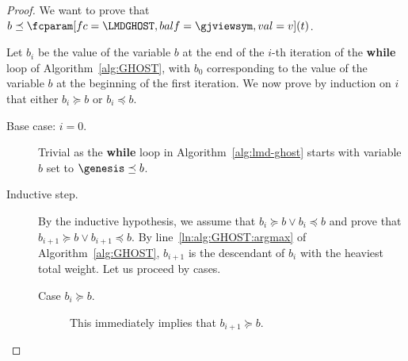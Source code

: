 \documentclass{article}
\begin{document}
\begin{proof}


    We want to prove that $b \preceq \fcparam[fc=\LMDGHOST,balf=\gjviewsym,val=v](t)$.

    Let $b_i$ be the value of the variable $b$ at the end of the $i$-th iteration of the \textbf{while} loop %
    of Algorithm~\ref{alg:GHOST}, with $b_0$ corresponding to the value of the variable $b$ at the beginning of the first iteration.
    We now prove by induction on $i$ that either $b_i \succeq b$ or $b_i \preceq b$. %

    \begin{description}
        \item[Base case: $i=0$.]
        Trivial as the \textbf{while} loop in Algorithm~\ref{alg:lmd-ghost} starts with variable $b$ set to $\genesis \preceq b$.

        \item[Inductive step.]
        By the inductive hypothesis, we assume that $b_i \succeq b \lor b_i \preceq b$ and prove that $b_{i+1} \succeq b \lor b_{i+1} \preceq b$.
        By line~\ref{ln:alg:GHOST:argmax} of Algorithm~\ref{alg:GHOST}, $b_{i+1}$ is the descendant of $b_i$ with the heaviest total weight.
        Let us proceed by cases.
        \begin{description}
            \item[Case $b_i \succeq b$.]
            This immediately implies that $b_{i+1} \succeq b$.


\end{description}
\end{description}
\end{proof}
\end{document}
